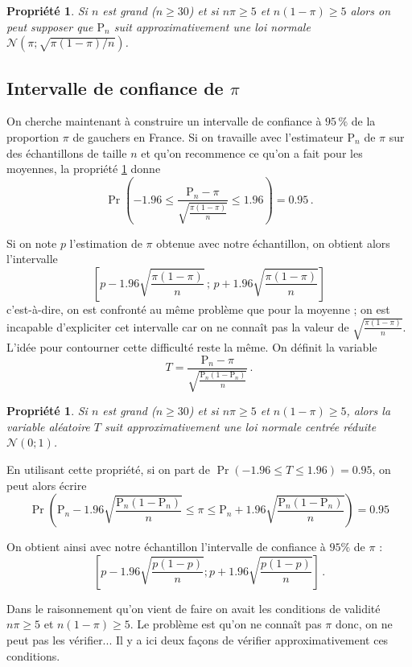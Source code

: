 \documentclass[12pt, a4paper]{book}
\newtheorem{prop}[thm]{Propriété}
\numberwithin{equation}{section}
\begin{document}
\begin{prop}
Si $n$ est grand ($n\geq 30$) et si $n\pi\geq 5$ et $n(1-\pi)\geq 5$ alors on peut supposer
que $\mathrm{P}_n$ suit approximativement une loi normale 
$\displaystyle \mathcal{N}(\pi;\sqrt{\pi(1-\pi)/n})$.
\label{loiestprop}
\end{prop}


\subsection[Intervalle de confiance]{Intervalle de confiance de $\pi$}


On cherche maintenant à construire  un intervalle de confiance à $95\,\%$ de la proportion $\pi$ de gauchers en France. 
Si on travaille avec l'estimateur $\mathrm{P}_n$ de $\pi$ sur des échantillons de taille $n$ et qu'on
recommence ce qu'on a fait pour les moyennes, la propriété \ref{loiestprop} donne
$$
\Pr\left(-1.96 \leq \frac{\mathrm{P}_n - \pi}{\sqrt{\frac{\pi (1-\pi)}{n}}} \leq 1.96\right) = 0.95\,.
$$

Si on note $p$ l'estimation de $\pi$ obtenue avec notre échantillon, on obtient alors l'intervalle 
$$
\left[ p -1.96 \sqrt{\frac{\pi(1-\pi)}{n}} \,;\,  p + 1.96 \sqrt{\frac{\pi(1-\pi)}{n}} \right] 
$$
c'est-à-dire, on est confronté au même problème que pour la moyenne ; on est incapable d'expliciter
cet intervalle car on ne connaît pas la valeur de $\sqrt{\frac{\pi(1-\pi)}{n}}$. 
L'idée pour contourner cette difficulté reste la même. On définit la variable
$$
T=\frac{\mathrm{P}_n - \pi}{\sqrt{\frac{\mathrm{P}_n (1-\mathrm{P}_n)}{n}}}\,.
$$ 

\begin{prop}
Si $n$ est grand ($n\geq 30$) et si $n\pi\geq 5$ et $n(1-\pi)\geq 5$, alors la variable aléatoire
$T$ suit approximativement une loi normale centrée réduite $\mathcal{N}(0;1)$.
\end{prop}


En utilisant cette propriété, si on part de $\Pr(-1.96 \leq T \leq 1.96)= 0.95$, on peut alors écrire
$$
\Pr\left( \mathrm{P}_n -1.96 \sqrt{\frac{\mathrm{P}_n (1-\mathrm{P}_n)}{n}} \leq \pi \leq  \mathrm{P}_n + 
1.96 \sqrt{\frac{\mathrm{P}_n (1-\mathrm{P}_n)}{n}} \right)=0.95
$$

On obtient ainsi avec notre échantillon l'intervalle de confiance à $95 \%$ de $\pi$ :
$$
\left[ p -1.96 \sqrt{\frac{p(1-p)}{n}} ; p +1.96 \sqrt{\frac{p(1-p)}{n}} \right]\,.
$$

 Dans le raisonnement qu'on vient de faire on avait les conditions de validité $n\pi\geq 5$
et $n(1-\pi)\geq 5$. Le problème est qu'on ne connaît pas $\pi$ donc, on ne peut pas les vérifier... Il y a ici deux 
façons de vérifier approximativement ces conditions. 
\end{document}
